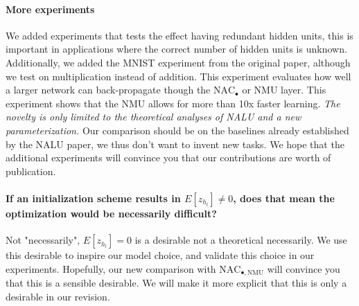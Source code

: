 \documentclass{article}
\begin{document}
\vspace{-0.5cm} \paragraph{More experiments} We added experiments that tests the effect having redundant hidden units, this is important in applications where the correct number of hidden units is unknown. Additionally, we added the MNIST experiment from the original paper, although we test on multiplication instead of addition. This experiment evaluates how well a larger network can back-propagate though the $\mathrm{NAC}_{\bullet}$ or NMU layer. This experiment shows that the NMU allows for more than 10x faster learning. \textit{The novelty is only limited to the theoretical analyses of NALU and a new parameterization.} Our comparison should be on the baselines already established by the NALU paper, we thus don't want to invent new tasks. We hope that the additional experiments will convince you that our contributions are worth of publication.

\vspace{-0.3cm} \paragraph{If an initialization scheme results in $E[z_{h_l}] \ne 0$, does that mean the optimization would be necessarily difficult?} Not "necessarily", $E[z_{h_l}] = 0$ is a desirable not a theoretical necessarily. We use this desirable to inspire our model choice, and validate this choice in our experiments. Hopefully, our new comparison with $\mathrm{NAC}_{\bullet, \mathrm{NMU}}$ will convince you that this is a sensible desirable. We will make it more explicit that this is only a desirable in our revision. 
\end{document}
